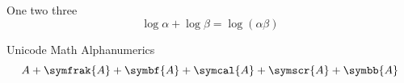 \documentclass[a4paper]{article}
\begin{document}
One two three
\[
\log \alpha + \log \beta = \log(\alpha\beta)
\]

Unicode Math Alphanumerics
\[A + \symfrak{A}+\symbf{A}+ \symcal{A}+ \symscr{A}+ \symbb{A}
\]
\end{document}
